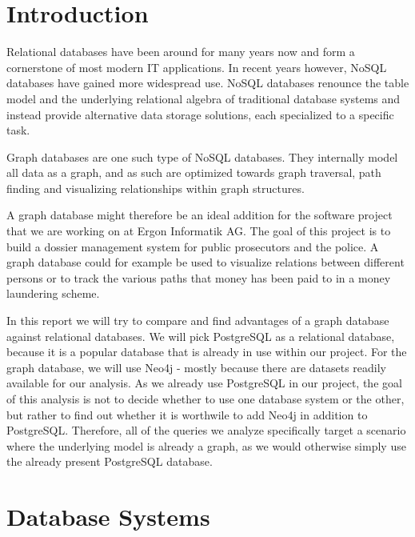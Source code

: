 \documentclass[11pt, a4paper,oneside,chapterprefix=false]{scrbook}
\begin{document}
\tableofcontents

\mainmatter

\chapter{Introduction} \label{chp:introduction}

Relational databases have been around for many years now and form a cornerstone of most modern IT applications.
In recent years however, NoSQL databases have gained more widespread use.
NoSQL databases renounce the table model and the underlying relational algebra of traditional database systems and instead provide alternative data storage solutions, each specialized to a specific task.

Graph databases are one such type of NoSQL databases.
They internally model all data as a graph, and as such are optimized towards graph traversal, path finding and visualizing relationships within graph structures.

A graph database might therefore be an ideal addition for the software project that we are working on at Ergon Informatik AG.
The goal of this project is to build a dossier management system for public prosecutors and the police.
A graph database could for example be used to visualize relations between different persons or to track the various paths that money has been paid to in a money laundering scheme.

In this report we will try to compare and find advantages of a graph database against relational databases.
We will pick PostgreSQL as a relational database, because it is a popular database that is already in use within our project.
For the graph database, we will use Neo4j - mostly because there are datasets readily available for our analysis.
As we already use PostgreSQL in our project, the goal of this analysis is not to decide whether to use one database system or the other, but rather to find out whether it is worthwile to add Neo4j in addition to PostgreSQL.
Therefore, all of the queries we analyze specifically target a scenario where the underlying model is already a graph, as we would otherwise simply use the already present PostgreSQL database.

\chapter{Database Systems} \label{chp:theory}
\end{document}
